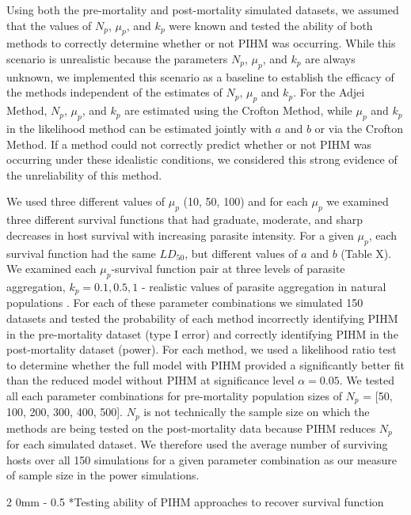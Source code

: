 \documentclass[12pt, a4paper]{article}
\makeatletter
\renewcommand{\subsection}{\@startsection
{subsection}%
{2}%
{0mm}%
{-\baselineskip}%
{0.5\baselineskip}%
{\normalfont\bf}} %
\makeatother
\begin{document}
Using both the pre-mortality and post-mortality simulated datasets,  we assumed
that the values of $N_p$, $\mu_p$, and $k_p$ were known and tested the ability of both methods to correctly determine whether or not PIHM was occurring.  While this scenario is unrealistic because the parameters $N_p$,
$\mu_p$, and $k_p$ are always unknown, we implemented this scenario as a baseline to
establish the efficacy of the methods independent of the estimates of $N_p$, $\mu_p$ and $k_p$.  For the Adjei Method, $N_p$, $\mu_p$, and $k_p$ are estimated using the Crofton Method, while $\mu_p$ and $k_p$ in the likelihood method can be estimated jointly with $a$ and $b$ or via the Crofton Method.   If a
method could not correctly predict whether or not PIHM was occurring under these idealistic conditions, we considered this strong evidence of the unreliability of this method.

We used three different values of $\mu_p$ (10, 50, 100) and for each $\mu_p$ we examined three different survival functions that had graduate, moderate, and sharp decreases in host survival with increasing parasite intensity.  For a given $\mu_p$, each survival function had the same $LD_{50}$, but different values of $a$ and $b$ (Table X).  We examined each $\mu_p$-survival function pair at  three levels of parasite
aggregation, $k_p = 0.1, 0.5, 1$ - realistic values of parasite aggregation in natural populations \citep{Shaw1998}.  For each of these parameter
combinations we simulated 150 datasets and tested the probability of each method incorrectly identifying PIHM in the pre-mortality dataset (type I error) and correctly identifying PIHM in the post-mortality dataset (power).  For each method, we used a likelihood ratio test to determine whether the full model with PIHM provided a significantly better fit than the reduced model without PIHM at significance level $\alpha = 0.05$.  We tested all each parameter combinations for pre-mortality population sizes of $N_p$ = [50, 100, 200, 300, 400, 500]. $N_p$ is not technically the sample size on which the methods are being
tested on the post-mortality data because PIHM reduces $N_p$ for each simulated
dataset.  We therefore used the average number of surviving hosts over all 150 simulations for a given parameter combination as our measure of sample size in the power simulations.

\subsection*{Testing ability of PIHM approaches to recover survival function}
\end{document}

